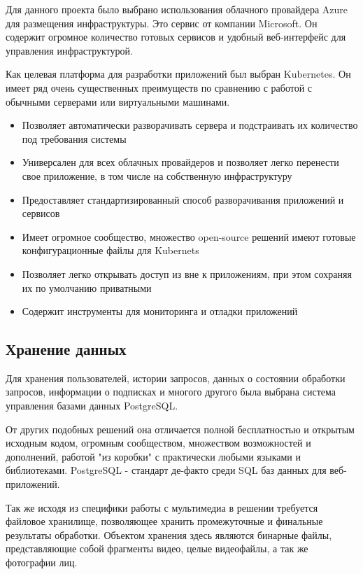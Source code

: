 Для данного проекта было выбрано использования облачного провайдера Azure для размещения инфраструктуры. Это сервис от компании Microsoft. Он содержит огромное количество готовых сервисов и удобный веб-интерфейс для управления инфраструктурой.

Как целевая платформа для разработки приложений был выбран Kubernetes. Он имеет ряд очень существенных преимуществ по сравнению с работой с обычными серверами или виртуальными машинами.

\begin{itemize}
	\item Позволяет автоматически разворачивать сервера и подстраивать их количество под требования системы
	\item Универсален для всех облачных провайдеров и позволяет легко перенести свое приложение, в том числе на собственную инфраструктуру
	\item Предоставляет стандартизированный способ разворачивания приложений и сервисов
	\item Имеет огромное сообщество, множество open-source решений имеют готовые конфигурационные файлы для Kubernets
	\item Позволяет легко открывать доступ из вне к приложениям, при этом сохраняя их по умолчанию приватными
	\item Содержит инструменты для мониторинга и отладки приложений
\end{itemize}

\subsection{Хранение данных}

Для хранения пользователей, истории запросов, данных о состоянии обработки запросов, информации о подписках и многого другого была выбрана система управления базами данных PostgreSQL.

От других подобных решений она отличается полной бесплатностью и открытым исходным кодом, огромным сообществом, множеством возможностей и дополнений, работой "из коробки" с практически любыми языками и библиотеками. PostgreSQL - стандарт де-факто среди SQL баз данных для веб-приложений.

Так же исходя из специфики работы с мультимедиа в решении требуется файловое хранилище, позволяющее хранить промежуточные и финальные результаты обработки. Объектом хранения здесь являются бинарные файлы, представляющие собой фрагменты видео, целые видеофайлы, а так же фотографии лиц.

